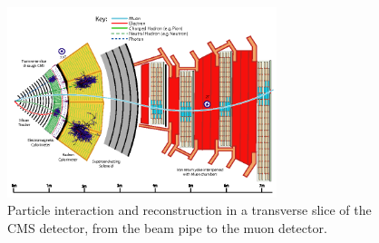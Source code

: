 \begin{figure}[htbp]
\centering
\includegraphics[width=0.7\textwidth]{Images/ParticleFlow}
\caption{Particle interaction and reconstruction in a transverse slice of the CMS detector, from the beam pipe to the muon detector.}
\label{ParticleFlow}
\end{figure}

